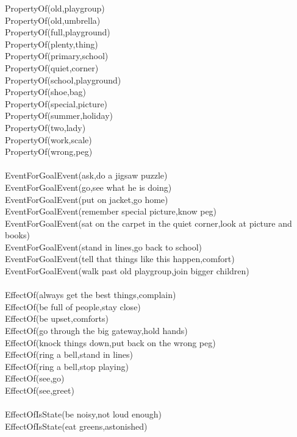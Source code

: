 \begin{multicols}{2}
\begin{footnotesize}
PropertyOf(old,playgroup) \\
PropertyOf(old,umbrella) \\
PropertyOf(full,playground) \\
PropertyOf(plenty,thing) \\
PropertyOf(primary,school) \\
PropertyOf(quiet,corner) \\
PropertyOf(school,playground) \\
PropertyOf(shoe,bag) \\
PropertyOf(special,picture) \\
PropertyOf(summer,holiday) \\
PropertyOf(two,lady) \\
PropertyOf(work,scale) \\
PropertyOf(wrong,peg) \\
~\\
EventForGoalEvent(ask,do a jigsaw puzzle) \\
EventForGoalEvent(go,see what he is doing) \\
EventForGoalEvent(put on jacket,go home) \\
EventForGoalEvent(remember special picture,know peg) \\
EventForGoalEvent(sat on the carpet in the quiet corner,look at picture and books) \\
EventForGoalEvent(stand in lines,go back to school) \\
EventForGoalEvent(tell that things like this happen,comfort) \\
EventForGoalEvent(walk past old playgroup,join bigger children) \\
~\\
EffectOf(always get the best things,complain) \\
EffectOf(be full of people,stay close) \\
EffectOf(be upset,comforts) \\
EffectOf(go through the big gateway,hold hands) \\
EffectOf(knock things down,put back on the wrong peg) \\
EffectOf(ring a bell,stand in lines) \\
EffectOf(ring a bell,stop playing) \\
EffectOf(see,go) \\
EffectOf(see,greet) \\
~\\
EffectOfIsState(be noisy,not loud enough) \\
EffectOfIsState(eat greens,astonished) \\

\end{footnotesize}
\end{multicols}
